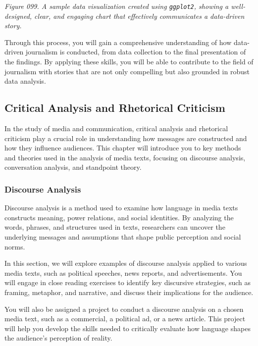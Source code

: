 \documentclass[
]{book}
\begin{document}
\emph{Figure 099. A sample data visualization created using \texttt{ggplot2}, showing a well-designed, clear, and engaging chart that effectively communicates a data-driven story.}

Through this process, you will gain a comprehensive understanding of how data-driven journalism is conducted, from data collection to the final presentation of the findings. By applying these skills, you will be able to contribute to the field of journalism with stories that are not only compelling but also grounded in robust data analysis.

\subsection{Critical Analysis and Rhetorical Criticism}\label{critical-analysis-and-rhetorical-criticism}

In the study of media and communication, critical analysis and rhetorical criticism play a crucial role in understanding how messages are constructed and how they influence audiences. This chapter will introduce you to key methods and theories used in the analysis of media texts, focusing on discourse analysis, conversation analysis, and standpoint theory.

\subsubsection{Discourse Analysis}\label{discourse-analysis}

Discourse analysis is a method used to examine how language in media texts constructs meaning, power relations, and social identities. By analyzing the words, phrases, and structures used in texts, researchers can uncover the underlying messages and assumptions that shape public perception and social norms.

In this section, we will explore examples of discourse analysis applied to various media texts, such as political speeches, news reports, and advertisements. You will engage in close reading exercises to identify key discursive strategies, such as framing, metaphor, and narrative, and discuss their implications for the audience.

You will also be assigned a project to conduct a discourse analysis on a chosen media text, such as a commercial, a political ad, or a news article. This project will help you develop the skills needed to critically evaluate how language shapes the audience's perception of reality.
\end{document}
